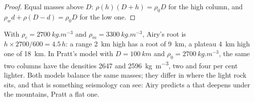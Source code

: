 \begin{proof}
Equal masses above $D$: $\rho(h)(D + h) = \rho_0 D$ for the high column, and
$\rho_w d + \rho(D - d) = \rho_0 D$ for the low one.
\end{proof}

With $\rho_c = \qty{2700}{kg.m^{-3}}$ and $\rho_m = \qty{3300}{kg.m^{-3}}$, Airy's
root is $h\times2700/600 = 4.5\,h$: a range \qty{2}{km} high has a root of
\qty{9}{km}, a plateau \qty{4}{km} high one of \qty{18}{km}. In Pratt's model
with $D = \qty{100}{km}$ and $\rho_0 = \qty{2700}{kg.m^{-3}}$, the same two
columns have the densities 2647 and \qty{2596}{kg.m^{-3}}, two and four per cent
lighter. Both models balance the same masses; they differ in where the light
rock sits, and that is something seismology can see: Airy predicts a  that
deepens under the mountains, Pratt a flat one.

